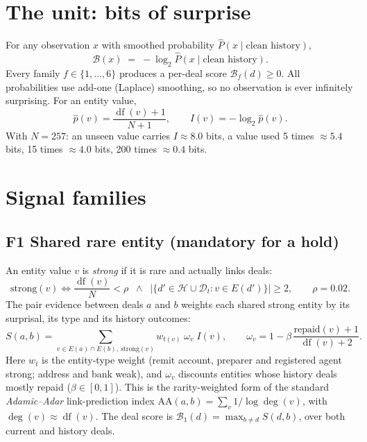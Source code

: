 \documentclass[11pt]{article}
\newcommand{\B}{\mathcal{B}}
\newcommand{\df}{\operatorname{df}}
\begin{document}
\section{The unit: bits of surprise}
For any observation $x$ with smoothed probability $\hat P(x\mid\text{clean history})$,
\begin{equation}
\B(x) \;=\; -\log_2 \hat P(x\mid\text{clean history}) .
\end{equation}
Every family $f\in\{1,\dots,6\}$ produces a per-deal score $\B_f(d)\ge 0$.
All probabilities use add-one (Laplace) smoothing, so no observation is ever infinitely surprising.
For an entity value,
\begin{equation}
\hat p(v)=\frac{\df(v)+1}{N+1},\qquad I(v)=-\log_2 \hat p(v).
\end{equation}
With $N=257$: an unseen value carries $I\approx 8.0$ bits, a value used 5 times $\approx 5.4$ bits, 15 times $\approx 4.0$ bits, 200 times $\approx 0.4$ bits.

\section{Signal families}

\subsection*{F1 \quad Shared rare entity (mandatory for a hold)}
An entity value $v$ is \emph{strong} if it is rare and actually links deals:
\begin{equation}
\text{strong}(v)\iff \frac{\df(v)}{N}<\rho \;\;\wedge\;\; |\{d'\in\mathcal{H}\cup\mathcal{D}_t: v\in E(d')\}|\ge 2,\qquad \rho=0.02 .
\end{equation}
The pair evidence between deals $a$ and $b$ weights each shared strong entity by its surprisal, its type and its history outcomes:
\begin{equation}
S(a,b)=\sum_{v\in E(a)\cap E(b),\ \text{strong}(v)} w_{t(v)}\;\omega_v\;I(v),
\qquad
\omega_v = 1-\beta\,\frac{\text{repaid}(v)+1}{\df(v)+2}.
\end{equation}
Here $w_t$ is the entity-type weight (remit account, preparer and registered agent strong; address and bank weak), and $\omega_v$ discounts entities whose history deals mostly repaid ($\beta\in[0,1]$).
This is the rarity-weighted form of the standard \emph{Adamic--Adar} link-prediction index $\mathrm{AA}(a,b)=\sum_{v}1/\log\deg(v)$, with $\deg(v)\approx\df(v)$.
The deal score is $\B_1(d)=\max_{b\neq d} S(d,b)$, over both current and history deals.
\end{document}
